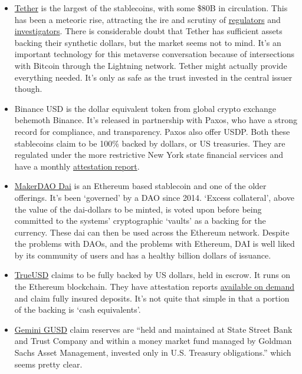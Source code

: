 \begin{itemize}
\item \href{https://tether.to/en/whitepaper/}{Tether} is the largest of the stablecoins, with some \$80B in circulation. This has been a meteoric rise, attracting the ire and scrutiny of \href{https://www.cftc.gov/PressRoom/PressReleases/8450-21}{regulators} and \href{https://www.bloomberg.com/news/features/2021-10-07/crypto-mystery-where-s-the-69-billion-backing-the-stablecoin-tether}{investigators}. There is considerable doubt that Tether has sufficient assets backing their synthetic dollars, but the market seems not to mind. It's an important technology for this metaverse conversation because of intersections with Bitcoin through the Lightning network. Tether might actually provide everything needed. It's only as safe as the trust invested in the central issuer though.
\item Binance USD is the dollar equivalent token from global crypto exchange behemoth Binance. It's released in partnership with Paxos, who have a strong record for compliance, and transparency. Paxos also offer USDP. Both these stablecoins claim to be 100\% backed by dollars, or US treasuries. They are regulated under the more restrictive New York state financial services and have a monthly \href{https://paxos.com/attestations/}{attestation report}.
\item \href{https://makerdao.com/en/whitepaper#abstract}{MakerDAO Dai} is an Ethereum based stablecoin and one of the older offerings. It's been `governed' by a DAO since 2014. `Excess collateral', above the value of the dai-dollars to be minted, is voted upon before being committed to the systems' cryptographic `vaults' as a backing for the currency. These dai can then be used across the Ethereum network. Despite the problems with DAOs, and the problems with Ethereum, DAI is well liked by its community of users and has a healthy billion dollars of issuance.
\item \href{https://trueusd.com/pdf/TUSD_WhitePaper.pdf}{TrueUSD} claims to be fully backed by US dollars, held in escrow. It runs on the Ethereum blockchain. They have attestation reports \href{https://real-time-attest.trustexplorer.io/truecurrencies}{available on demand} and claim fully insured deposits. It's not quite that simple in that a portion of the backing is `cash equivalents'.
\item \href{https://www.gemini.com/static/dollar/gemini-dollar-whitepaper.pdf}{Gemini GUSD} claim reserves are ``held and maintained at State Street Bank and Trust Company and within a money market fund managed by Goldman Sachs Asset Management, invested only in U.S. Treasury obligations.'' which seems pretty clear.

\end{itemize}
